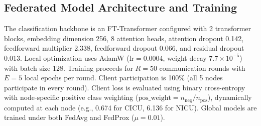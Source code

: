 \documentclass[runningheads]{llncs}
\begin{document}
\subsection{Federated Model Architecture and Training}
The classification backbone is an FT-Transformer \cite{gorishniy2021revisiting} configured with 2 transformer blocks, embedding dimension 256, 8 attention heads, attention dropout 0.142, feedforward multiplier 2.338, feedforward dropout 0.066, and residual dropout 0.013. Local optimization uses AdamW ($\text{lr} = 0.0004$, weight decay $7.7\times 10^{-5}$) with batch size 128. Training proceeds for $R = 50$ communication rounds with $E = 5$ local epochs per round. Client participation is 100\% (all 5 nodes participate in every round). Client loss is evaluated using binary cross-entropy with node-specific positive class weighting ($\text{pos\_weight} = n_{\text{neg}} / n_{\text{pos}}$), dynamically computed at each node (e.g., 0.674 for CICU, 6.136 for NICU). Global models are trained under both FedAvg and FedProx ($\mu = 0.01$).
\end{document}
